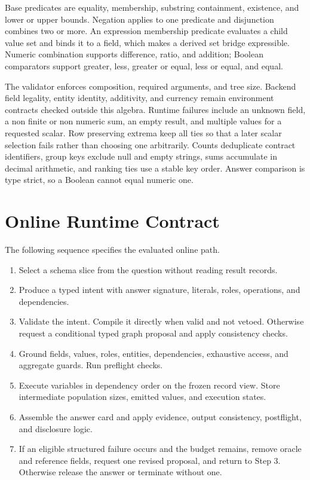 \documentclass{article}
\begin{document}
Base predicates are equality, membership, substring containment, existence, and lower or upper
bounds.  Negation applies to one predicate and disjunction combines two or more.  An expression
membership predicate evaluates a child value set and binds it to a field, which makes a derived set
bridge expressible.  Numeric combination supports difference, ratio, and addition; Boolean
comparators support greater, less, greater or equal, less or equal, and equal.

The validator enforces composition, required arguments, and tree size.  Backend field legality,
entity identity, additivity, and currency remain environment contracts checked outside this algebra.
Runtime failures include an unknown field, a non finite or non numeric sum, an empty result, and
multiple values for a requested scalar.  Row preserving extrema keep all ties so that a later scalar
selection fails rather than choosing one arbitrarily.  Counts deduplicate contract identifiers,
group keys exclude null and empty strings, sums accumulate in decimal arithmetic, and ranking ties
use a stable key order.  Answer comparison is type strict, so a Boolean cannot equal numeric one.

\section{Online Runtime Contract}
\label{app:runtime}

The following sequence specifies the evaluated online path.

\begin{enumerate}
  \item Select a schema slice from the question without reading result records.
  \item Produce a typed intent with answer signature, literals, roles, operations, and dependencies.
  \item Validate the intent.  Compile it directly when valid and not vetoed.  Otherwise request a
  conditional typed graph proposal and apply consistency checks.
  \item Ground fields, values, roles, entities, dependencies, exhaustive access, and aggregate
  guards.  Run preflight checks.
  \item Execute variables in dependency order on the frozen record view.  Store intermediate
  population sizes, emitted values, and execution states.
  \item Assemble the answer card and apply evidence, output consistency, postflight, and disclosure
  logic.
  \item If an eligible structured failure occurs and the budget remains, remove oracle and
  reference fields, request one revised proposal, and return to Step 3.  Otherwise release the
  answer or terminate without one.
\end{enumerate}
\end{document}
